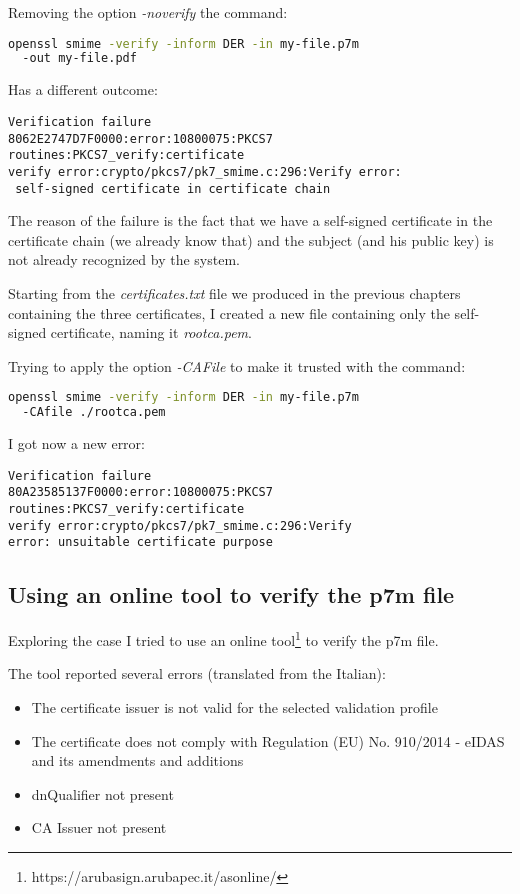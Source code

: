 \documentclass{article}
\begin{document}
Removing the option \emph{-noverify} the command:

\begin{lstlisting}[language=bash]
openssl smime -verify -inform DER -in my-file.p7m 
  -out my-file.pdf
\end{lstlisting}

Has a different outcome:

\begin{verbatim}
Verification failure
8062E2747D7F0000:error:10800075:PKCS7 routines:PKCS7_verify:certificate 
verify error:crypto/pkcs7/pk7_smime.c:296:Verify error:
 self-signed certificate in certificate chain
\end{verbatim}

The reason of the failure is the fact that we have a self-signed certificate
in the certificate chain (we already know that) and the subject (and his public key) is not already recognized
by the system.

Starting from the \emph{certificates.txt} file we produced in the previous chapters 
containing the three certificates, I created a new file containing only the self-signed certificate,
naming it \emph{rootca.pem}.

Trying to apply the option \emph{-CAFile} to make it trusted with the command:

\begin{lstlisting}[language=bash]
openssl smime -verify -inform DER -in my-file.p7m 
  -CAfile ./rootca.pem
\end{lstlisting}

I got now a new error:

\begin{verbatim}
Verification failure
80A23585137F0000:error:10800075:PKCS7 
routines:PKCS7_verify:certificate 
verify error:crypto/pkcs7/pk7_smime.c:296:Verify 
error: unsuitable certificate purpose
\end{verbatim}

\subsection{Using an online tool to verify the p7m file}

Exploring the case I tried to use an online tool\footnote{https://arubasign.arubapec.it/asonline/} 
to verify the p7m file.

The tool reported several errors (translated from the Italian):

\begin{itemize}
	\item The certificate issuer is not valid for the selected validation profile
	\item The certificate does not comply with Regulation (EU) No. 910/2014 - eIDAS and its amendments and additions
	\item dnQualifier not present
	\item CA Issuer not present
\end{itemize}
\end{document}
